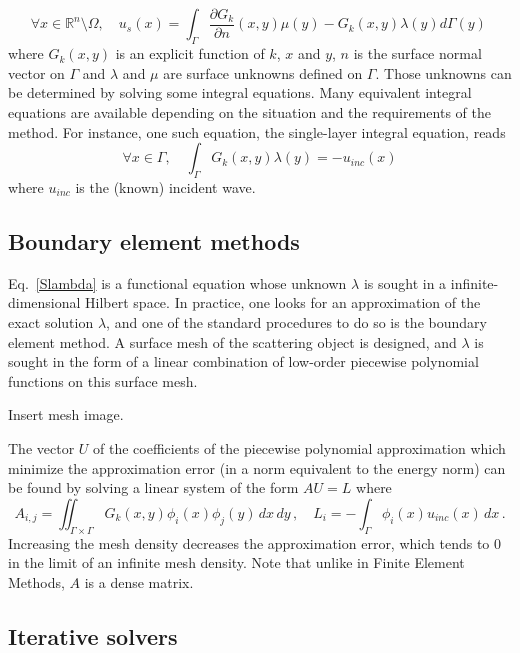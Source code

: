 \documentclass[]{article}
\begin{document}
\[\forall x \in \mathbb{R}^n \setminus{\Omega}, \quad u_s(x) =  \int_{\Gamma} \dfrac{\partial G_k}{\partial n}(x,y) \mu(y) -  G_k(x,y) \lambda(y) d\Gamma(y)\, \] 
where $G_k(x,y)$ is an explicit function of $k$, $x$ and $y$, $n$ is the surface normal vector on $\Gamma$ and $\lambda$ and $\mu$ are surface unknowns defined on $\Gamma$. Those unknowns can be determined by solving some integral equations. Many equivalent integral equations are available depending on the situation and the requirements of the method. For instance, one such equation, the single-layer integral equation, reads
\begin{equation}
	\label{Slambda}
 	\forall x \in \Gamma, \quad \int_{\Gamma} G_k(x,y) \lambda(y) = -u_{inc}(x)
\end{equation}
where $u_{inc}$ is the (known) incident wave. 

\subsection*{Boundary element methods}

Eq.~\eqref{Slambda} is a functional equation whose unknown $\lambda$ is sought in a infinite-dimensional Hilbert space. In practice, one looks for an approximation of the exact solution $\lambda$, and one of the standard procedures to do so is the boundary element method. A surface mesh of the scattering object is designed, and $\lambda$ is sought in the form of a linear combination of low-order piecewise polynomial functions on this surface mesh. 

{\color{red} Insert mesh image.}

The vector $U$ of the coefficients of the piecewise polynomial approximation which minimize the approximation error (in a norm equivalent to the energy norm) can be found by solving a linear system of the form $A U = L$ where
\[A_{i,j} = \iint_{\Gamma\times \Gamma} G_k(x,y) \phi_i(x) \phi_j(y) \,dx\,dy\,,\quad  L_i = -\int_{\Gamma} \phi_i(x) u_{inc}(x)\,dx\,. \]
Increasing the mesh density decreases the approximation error, which tends to $0$ in the limit of an infinite mesh density. Note that unlike in  Finite Element Methods, $A$ is a dense matrix. 

\subsection*{Iterative solvers}
\end{document}
